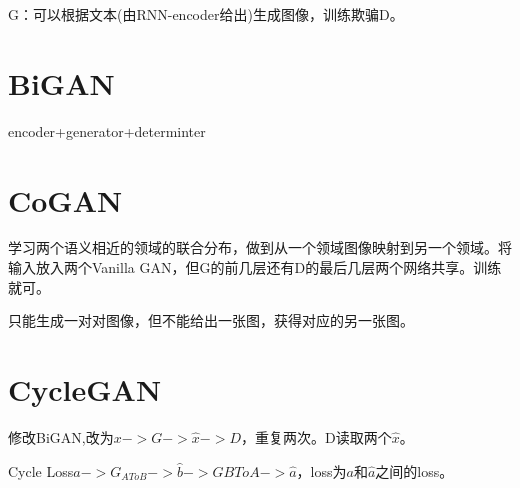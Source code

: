 \documentclass[UTF8]{ctexart}
\begin{document}
G：可以根据文本(由RNN-encoder给出)生成图像，训练欺骗D。

\section{BiGAN}
encoder+generator+determinter

\section{CoGAN}
学习两个语义相近的领域的联合分布，做到从一个领域图像映射到另一个领域。将输入放入两个Vanilla GAN，但G的前几层还有D的最后几层两个网络共享。训练就可。

只能生成一对对图像，但不能给出一张图，获得对应的另一张图。

\section{CycleGAN}
修改BiGAN,改为$x->G->\hat{x}->D$，重复两次。D读取两个$\hat{x}$。

Cycle Loss$a->G_{AToB}->\hat{b}->G{BToA}->\hat{a}$，loss为$a和\hat{a}$之间的loss。
\end{document}
